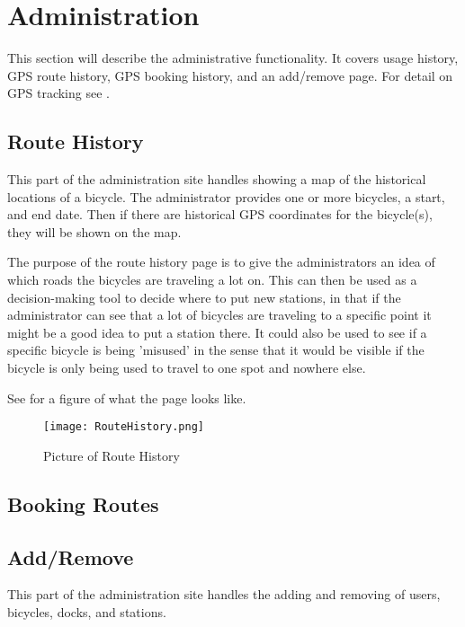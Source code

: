 \section{Administration}
This section will describe the administrative functionality. 
It covers usage history, GPS route history, GPS booking history, and an add/remove page. 
For detail on GPS tracking see .

\subsection{Route History}
This part of the administration site handles showing a map of the historical locations of a bicycle.
The administrator provides one or more bicycles, a start, and end date.
Then if there are historical GPS coordinates for the bicycle(s), they will be shown on the map. 

The purpose of the route history page is to give the administrators an idea of which roads the bicycles are traveling a lot on. 
This can then be used as a decision-making tool to decide where to put new stations, in that if the administrator can see that a lot of bicycles are traveling to a specific point it might be a good idea to put a station there.
It could also be used to see if a specific bicycle is being 'misused' in the sense that it would be visible if the bicycle is only being used to travel to one spot and nowhere else.

See  for a figure of what the page looks like.

\begin{figure}[H]
	\centering
	\texttt{[image: RouteHistory.png]}
	\caption{Picture of Route History}
	\label{fig:routehistory}
\end{figure}


\subsection{Booking Routes}

\subsection{Add/Remove}
This part of the administration site handles the adding and removing of users, bicycles, docks, and stations.

